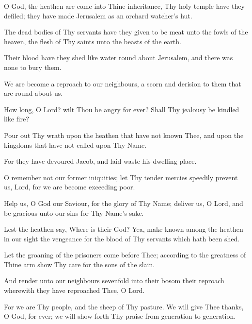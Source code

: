 O God, the heathen are come into Thine inheritance, Thy holy temple have they defiled; they have made Jerusalem as an orchard watcher’s hut.

The dead bodies of Thy servants have they given to be meat unto the fowls of the heaven, the flesh of Thy saints unto the beasts of the earth.

Their blood have they shed like water round about Jerusalem, and there was none to bury them.

We are become a reproach to our neighbours, a scorn and derision to them that are round about us.

How long, O Lord? wilt Thou be angry for ever? Shall Thy jealousy be kindled like fire?

Pour out Thy wrath upon the heathen that have not known Thee, and upon the kingdoms that have not called upon Thy Name.

For they have devoured Jacob, and laid waste his dwelling place.

O remember not our former iniquities; let Thy tender mercies speedily prevent us, Lord, for we are become exceeding poor.

Help us, O God our Saviour, for the glory of Thy Name; deliver us, O Lord, and be gracious unto our sins for Thy Name's sake.

Lest the heathen say, Where is their God? Yea, make known among the heathen in our sight the vengeance for the blood of Thy servants which hath been shed.

Let the groaning of the prisoners come before Thee; according to the greatness of Thine arm show Thy care for the sons of the slain.

And render unto our neighbours sevenfold into their bosom their reproach wherewith they have reproached Thee, O Lord.

For we are Thy people, and the sheep of Thy pasture. We will give Thee thanks, O God, for ever; we will show forth Thy praise from generation to generation.
